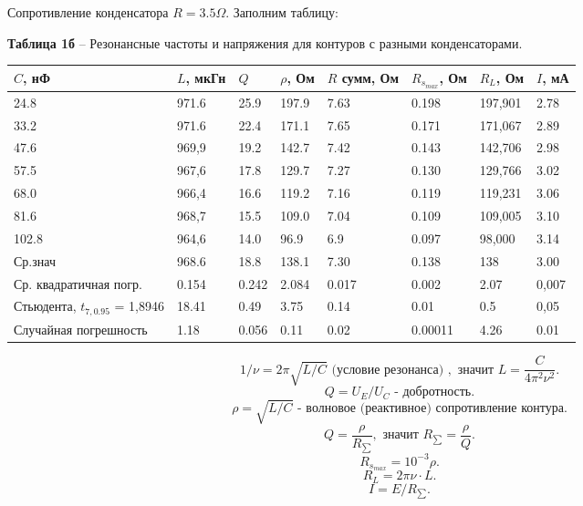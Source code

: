 \documentclass[12pt,a4paper]{article}
\begin{document}
        Сопротивление конденсатора $R = 3.5 \Omega.$
        Заполним таблицу:
        \begin{table}[!h]
            \begin{center}
           		\textbf{Таблица 1б} -- Резонансные частоты и напряжения для контуров с разными конденсаторами.\\
                \begin{tabular}{ | l | l | l | l | l | l | l | l | }
                    \hline
                    $C$, нФ    &   $L$, мкГн   &   $Q$     &  $\rho$, Ом    & $R$ сумм, Ом  & $R_{s_{max}}$, Ом   & $R_L$, Ом & $I$, мА \\
                    \hline
                    24.8    & 971.6 & 25.9  &   197.9  &    7.63    &   0.198   & 197,901 &  2.78    \\
                    33.2    & 971.6 & 22.4  &   171.1  &    7.65    &   0.171   & 171,067 &  2.89    \\
                    47.6    & 969,9 & 19.2  &   142.7  &    7.42    &   0.143   & 142,706 &  2.98    \\
                    57.5    & 967,6 & 17.8  &   129.7  &    7.27    &   0.130   & 129,766 &  3.02    \\
                    68.0    & 966,4 & 16.6  &   119.2  &    7.16    &   0.119   & 119,231 &  3.06    \\
                    81.6    & 968,7 & 15.5  &   109.0  &    7.04    &   0.109   & 109,005 &  3.10    \\
                    102.8   & 964,6 & 14.0  &   96.9   &    6.9     &   0.097   & 98,000  &  3.14    \\
                    \hline    
                    Ср.знач & 968.6 & 18.8  &   138.1  &    7.30    &   0.138   & 138     &  3.00    \\
                    \hline
                    Ср. квадратичная погр. & 0.154 & 0.242 & 2.084 & 0.017 & 0.002 & 2.07 & 0,007  \\
                    \hline
                    Стьюдента, $t_{7, 0.95}$ = 1,8946 & 18.41 & 0.49 & 3.75 & 0.14 & 0.01 & 0.5& 0,05 \\
                    \hline
                    Случайная погрешность & 1.18 & 0.056 & 0.11 & 0.02 & 0.00011 & 4.26 & 0.01 \\
                    \hline
                \end{tabular}
            \end{center}
        \end{table}
        \[
        1/\nu = 2\pi \sqrt{L/C} \text{ (условие резонанса) }, \text{ значит } L = \frac{C}{4\pi^2\nu^2}.
        \]
        \[
        Q = U_E/U_C \text{ - добротность}.
        \]
        \[
        \rho = \sqrt{L/C} \text{ - волновое (реактивное) сопротивление контура}.
        \]
        \[
        Q = \frac{\rho}{R_{\sum}}, \text{ значит } R_{\sum} = \frac{\rho}{Q}.
        \]
        \[
        R_{s_{max}} = 10^{-3}\rho.
        \]
        \[
        R_L = 2\pi\nu \cdot L.
        \]
        \[
        I = E/R_{\sum}.
        \]
        
\end{document}
